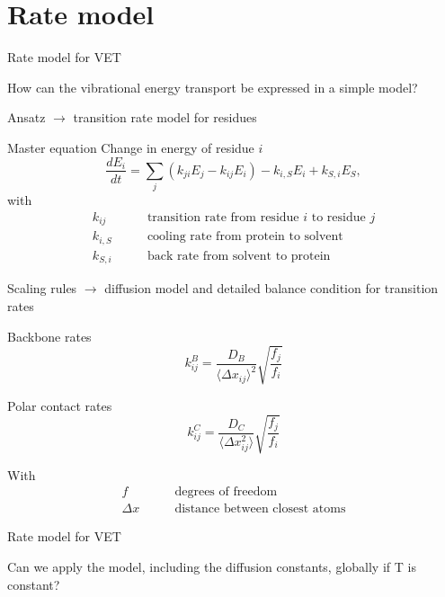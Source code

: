 \section{Rate model}

\begin{frame}[c]{Rate model for VET}
  \begin{center}
    How can the vibrational energy transport be expressed in a simple model?
  \end{center}
\end{frame}

\begin{frame}[t]{Ansatz}
  $\rightarrow$ transition rate model for residues
  \begin{block}{Master equation}
    Change in energy of residue $i$
    $$ \frac{dE_i}{dt} = \sum_j \left( k_{ji} E_j - k_{ij} E_i \right) - k_{i,S} E_i + k_{S,i} E_S,$$
    with
    \begin{align*}
      k_{ij}& \qquad \text{transition rate from residue $i$ to residue $j$}\\
      k_{i,S}& \qquad \text{cooling rate from protein to solvent}\\
      k_{S,i}& \qquad \text{back rate from solvent to protein}
    \end{align*}

  \end{block}
\end{frame}

\begin{frame}[t, shrink=20]{Scaling rules}
  $\rightarrow$ diffusion model and detailed balance condition for transition rates
 \begin{block}{Backbone rates}
   $$k_{ij}^B = \frac{D_B}{\langle\Delta x_{ij}\rangle^2}  \sqrt{ \frac{f_j}{f_i} } $$ 
 \end{block} 

 \begin{block}{Polar contact rates}
   $$ k_{ij}^C = \frac{D_C}{\langle\Delta x_{ij} ^2\rangle} \sqrt{\frac{f_j}{f_i}}  $$
 \end{block}
 With
  \begin{align*}
    f& \qquad \text{degrees of freedom}\\
    \Delta x& \qquad \text{distance between closest atoms}
  \end{align*}

\end{frame}

\begin{frame}[c]{Rate model for VET}
  \begin{center}
    Can we apply the model, including the diffusion constants, globally if T is constant?
  \end{center}
\end{frame}

